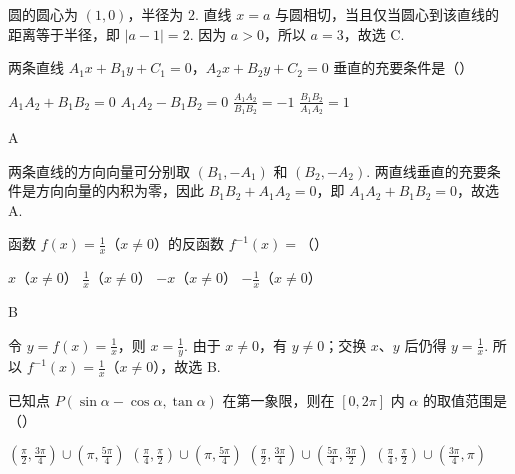 \begin{solution}
圆的圆心为 \((1,0)\)，半径为 \(2\). 直线 \(x=a\) 与圆相切，当且仅当圆心到该直线的距离等于半径，即 \(|a-1|=2\). 因为 \(a>0\)，所以 \(a=3\)，故选 C.
\end{solution}

\begin{problem}
两条直线 \(A_{1}x + B_{1}y + C_{1} = 0\)，\(A_{2}x + B_{2}y + C_{2} = 0\) 垂直的充要条件是（\quad）

\choices
    {\(A_{1}A_{2} + B_{1}B_{2} = 0\)}
    {\(A_{1}A_{2} - B_{1}B_{2} = 0\)}
    {\(\frac{A_1A_2}{B_1B_2} = -1\)}
    {\(\frac{B_1B_2}{A_1A_2} = 1\)}
\end{problem}

\begin{answer}
A
\end{answer}

\begin{solution}
两条直线的方向向量可分别取 \((B_{1},-A_{1})\) 和 \((B_{2},-A_{2})\). 两直线垂直的充要条件是方向向量的内积为零，因此
\(B_{1}B_{2}+A_{1}A_{2}=0\)，即 \(A_{1}A_{2}+B_{1}B_{2}=0\)，故选 A.
\end{solution}

\begin{problem}
函数 \(f(x)=\frac{1}{x}\)（\(x\neq 0\)）的反函数 \(f^{-1}(x)=\)（\quad）

\choices
    {\(x\)（\(x\neq 0\)）}
    {\(\frac{1}{x}\)（\(x\neq 0\)）}
    {\(-x\)（\(x\neq 0\)）}
    {\(-\frac{1}{x}\)（\(x\neq 0\)）}
\end{problem}

\begin{answer}
B
\end{answer}

\begin{solution}
令 \(y=f(x)=\frac{1}{x}\)，则 \(x=\frac{1}{y}\). 由于 \(x\neq0\)，有 \(y\neq0\)；交换 \(x\)、\(y\) 后仍得 \(y=\frac{1}{x}\). 所以 \(f^{-1}(x)=\frac{1}{x}\)（\(x\neq0\)），故选 B.
\end{solution}

\begin{problem}
已知点 \(P(\sin \alpha - \cos \alpha, \tan \alpha)\) 在第一象限，则在 \([0, 2\pi]\) 内 \(\alpha\) 的取值范围是（\quad）

\choices
    {\(\left(\frac{\pi}{2}, \frac{3\pi}{4}\right) \cup \left(\pi, \frac{5\pi}{4}\right)\)}
    {\(\left(\frac{\pi}{4}, \frac{\pi}{2}\right) \cup \left(\pi, \frac{5\pi}{4}\right)\)}
    {\(\left(\frac{\pi}{2}, \frac{3\pi}{4}\right) \cup \left(\frac{5\pi}{4}, \frac{3\pi}{2}\right)\)}
    {\(\left(\frac{\pi}{4}, \frac{\pi}{2}\right) \cup \left(\frac{3\pi}{4}, \pi\right)\)}
\end{problem}

